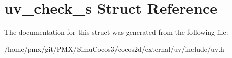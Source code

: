 \hypertarget{structuv__check__s}{}\section{uv\+\_\+check\+\_\+s Struct Reference}
\label{structuv__check__s}


The documentation for this struct was generated from the following file\+:\begin{DoxyCompactItemize}
\item 
/home/pmx/git/\+P\+M\+X/\+Simu\+Cocos3/cocos2d/external/uv/include/uv.\+h\end{DoxyCompactItemize}
